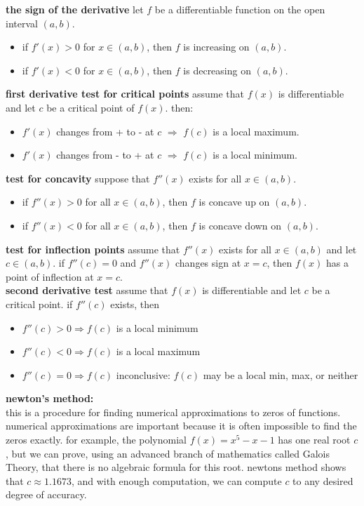 \documentclass{article}
\begin{document}
\textbf{the sign of the derivative} let $f$ be a differentiable function on the open interval $(a, b)$.
	\begin{itemize}
		\item if $f'(x) > 0$ for $x \in (a, b)$, then $f$ is increasing on $(a, b)$.
		\item if $f'(x) < 0$ for $x \in (a, b)$, then $f$ is decreasing on $(a, b)$. 
	\end{itemize}

\textbf{first derivative test for critical points} assume that $f(x)$ is differentiable and let $c$ be a critical point of $f(x)$. then:
	\begin{itemize}
		\item $f'(x)$ changes from + to - at $c$ $\Rightarrow$ $f(c)$ is a local maximum.
		\item $f'(x)$ changes from - to + at $c$ $\Rightarrow$ $f(c)$ is a local minimum. 
	\end{itemize}

\textbf{test for concavity} suppose that $f''(x)$ exists for all $x \in (a, b)$.
	\begin{itemize}
		\item if $f''(x) > 0$ for all $x \in (a, b)$, then $f$ is concave up on $(a, b)$.
		\item if $f''(x) < 0$ for all $x \in (a, b)$, then $f$ is concave down on $(a, b)$. 
	\end{itemize}

\textbf{test for inflection points} assume that $f''(x)$ exists for all $x \in (a, b)$ and let $c \in (a, b)$. if $f''(c) = 0$ and $f''(x)$ changes sign at $x = c$, then $f(x)$ has a point of inflection at $x = c$.\\

\textbf{second derivative test} assume that $f(x)$ is differentiable and let $c$ be a critical point. if $f''(c)$ exists, then
	\begin{itemize}
		\item $f''(c) > 0 \Rightarrow f(c)$ is a local minimum
		\item $f''(c) < 0 \Rightarrow f(c)$ is a local maximum 
		\item $f''(c) = 0 \Rightarrow f(c)$ inconclusive: $f(c)$ may be a local min, max, or neither
	\end{itemize}

\textbf{newton's method:}\\
this is a procedure for finding numerical approximations to zeros of functions. numerical approximations are important because it is often impossible to find the zeros exactly. for example, the polynomial $f(x) = x^5 - x - 1$ has one real root $c$, but we can prove, using an advanced branch of mathematics called Galois Theory, that there is no algebraic formula for this root. newtons method shows that $c \approx 1.1673$, and with enough computation, we can compute $c$ to any desired degree of accuracy.\\
\end{document}
